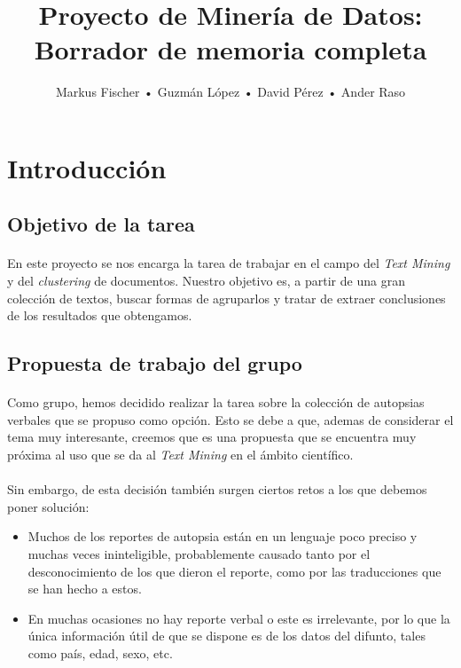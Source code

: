 \documentclass[10pt,a4paper]{article}
\author{Markus Fischer • Guzmán López • David Pérez • Ander Raso}
\title{Proyecto de Minería de Datos: \linebreak Borrador de memoria completa}
\date{}
\begin{document}
\maketitle
\newpage

\tableofcontents
\newpage

\section{Introducción}
	\subsection{Objetivo de la tarea}
	\paragraph{}
	En este proyecto se nos encarga la tarea de trabajar en el campo del \textit{Text Mining} y del \textit{clustering} de documentos. Nuestro objetivo es, a partir de una gran colección de textos, buscar formas de agruparlos y tratar de extraer conclusiones de los resultados que obtengamos.

	\subsection{Propuesta de trabajo del grupo}
	\paragraph{}
	Como grupo, hemos decidido realizar la tarea sobre la colección de autopsias verbales que se propuso como opción. Esto se debe a que, ademas de considerar el tema muy interesante, creemos que es una propuesta que se encuentra muy próxima al uso que se da al \textit{Text Mining} en el ámbito científico.
	\paragraph{}
    Sin embargo, de esta decisión también surgen ciertos retos a los que debemos poner solución:

	\begin{itemize}
		\item Muchos de los reportes de autopsia están en un lenguaje poco preciso y muchas veces ininteligible, probablemente causado tanto por el desconocimiento de los que dieron el reporte, como por las traducciones que se han hecho a estos.
		\item En muchas ocasiones no hay reporte verbal o este es irrelevante, por lo que la única información útil de que se dispone es de los datos del difunto, tales como país, edad, sexo, etc.
	\end{itemize}
\end{document}
